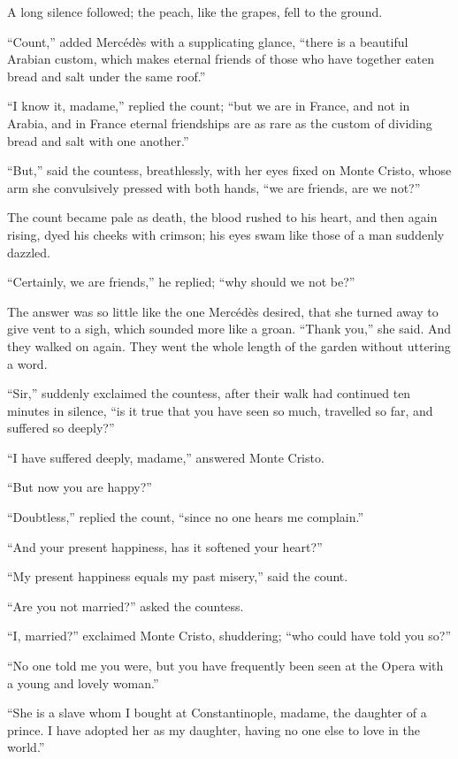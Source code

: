 A long silence followed; the peach, like the grapes, fell to the
ground.

“Count,” added Mercédès with a supplicating glance, “there is a
beautiful Arabian custom, which makes eternal friends of those who have
together eaten bread and salt under the same roof.”

“I know it, madame,” replied the count; “but we are in France, and not
in Arabia, and in France eternal friendships are as rare as the custom
of dividing bread and salt with one another.”

“But,” said the countess, breathlessly, with her eyes fixed on Monte
Cristo, whose arm she convulsively pressed with both hands, “we are
friends, are we not?”

The count became pale as death, the blood rushed to his heart, and then
again rising, dyed his cheeks with crimson; his eyes swam like those of
a man suddenly dazzled.

“Certainly, we are friends,” he replied; “why should we not be?”

The answer was so little like the one Mercédès desired, that she turned
away to give vent to a sigh, which sounded more like a groan. “Thank
you,” she said. And they walked on again. They went the whole length of
the garden without uttering a word.

“Sir,” suddenly exclaimed the countess, after their walk had continued
ten minutes in silence, “is it true that you have seen so much,
travelled so far, and suffered so deeply?”

“I have suffered deeply, madame,” answered Monte Cristo.

“But now you are happy?”

“Doubtless,” replied the count, “since no one hears me complain.”

“And your present happiness, has it softened your heart?”

“My present happiness equals my past misery,” said the count.

“Are you not married?” asked the countess.

“I, married?” exclaimed Monte Cristo, shuddering; “who could have told
you so?”

“No one told me you were, but you have frequently been seen at the
Opera with a young and lovely woman.”

“She is a slave whom I bought at Constantinople, madame, the daughter
of a prince. I have adopted her as my daughter, having no one else to
love in the world.”

